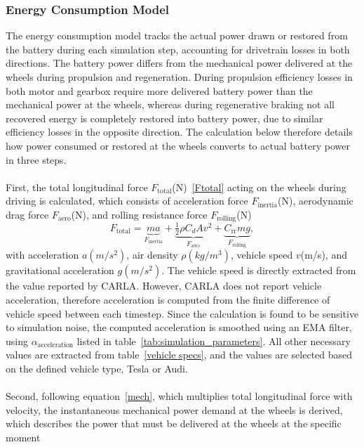 \subsubsection{Energy Consumption Model}
\label{energy model explain}
The energy consumption model tracks the actual power drawn or restored from the battery during each simulation step, accounting for drivetrain losses in both directions. The battery power differs from the mechanical power delivered at the wheels during propulsion and regeneration. During propulsion efficiency losses in both motor and gearbox require more delivered battery power than the mechanical power at the wheels, whereas during regenerative braking not all recovered energy is completely restored into battery power, due to similar efficiency losses in the opposite direction. The calculation below therefore details how power consumed or restored at the wheels converts to actual battery power in three steps.  
\\\\
First, the total longitudinal force \(F_\text{total}\)(N)~\ref{Ftotal} acting on the wheels during driving is calculated, which consists of acceleration force \(F_\text{inertia}\)(N), aerodynamic drag force \(F_\text{aero}\)(N), and rolling resistance force \(F_\text{rolling}\)(N) \begin{equation}
\label{Ftotal}
    F_\text{total} = \underbrace{ma}_{F_\text{inertia}} + \underbrace{\tfrac{1}{2}\rho C_d A v^2}_{F_\text{aero}} + \underbrace{C_\text{rr}mg}_{F_\text{rolling}},
\end{equation} with acceleration \(a (m/s^2)\), air density \(\rho (kg/m^3)\), vehicle speed \(v\)(m/s), and gravitational acceleration \(g (m/s^2)\). The vehicle speed is directly extracted from the value reported by CARLA. However, CARLA does not report vehicle acceleration, therefore acceleration is computed from the finite difference of vehicle speed between each timestep. Since the calculation is found to be sensitive to simulation noise, the computed acceleration is smoothed using an EMA filter, using \(\alpha_\text{acceleration}\) listed in table~\ref{tab:simulation_parameters}. All other necessary values are extracted from table~\ref{vehicle specs}, and the values are selected based on the defined vehicle type, Tesla or Audi.
\\\\
Second, following equation~\ref{mech}, which multiplies total longitudinal force with velocity, the instantaneous mechanical power demand at the wheels is derived, which describes the power that must be delivered at the wheels at the specific moment 
